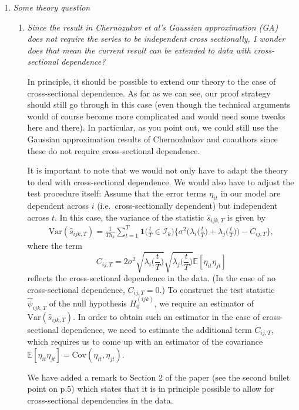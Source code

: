 \documentclass[a4paper,12pt]{article}
\begin{document}
\begin{enumerate}[label=(\arabic*),leftmargin=0.7cm]
\item \textit{Some theory question}

\begin{enumerate}[label=(\alph*),leftmargin=0.7cm]
\item \textit{Since the result in Chernozukov et al's Gaussian approximation (GA) does not require the series to be independent cross sectionally, I wonder does that mean the current result can be extended to data with cross-sectional dependence?}

In principle, it should be possible to extend our theory to the case of cross-sectional dependence. As far as we can see, our proof strategy should still go through in this case (even though the technical arguments would of course become more complicated and would need some tweaks here and there). In particular, as you point out, we could still use the Gaussian approximation results of Chernozhukov and coauthors since these do not require cross-sectional dependence. 

It is important to note that we would not only have to adapt the theory to deal with cross-sectional dependence. We would also have to adjust the test procedure itself: Assume that the error terms $\eta_{it}$ in our model are dependent across $i$ (i.e.\ cross-sectionally dependent) but independent across $t$. In this case, the variance of the statistic $\hat{s}_{ijk,T}$ is given by
\begin{align*}
\text{Var}(\hat{s}_{ijk,T}) = \frac{1}{Th_k} \sum_{t=1}^T \boldsymbol{1}\Big(\frac{t}{T} \in \mathcal{I}_k\Big) \bigg\{ \sigma^2 \Big( \lambda_i\Big(\frac{t}{T}\Big) + \lambda_j\Big(\frac{t}{T}\Big) \Big) - C_{ij,T} \bigg\},    
\end{align*}
where the term 
\[ C_{ij,T} = 2 \sigma^2 \sqrt{\lambda_i\Big(\frac{t}{T}\Big)} \sqrt{\lambda_j\Big(\frac{t}{T}\Big)} \mathbb{E}[\eta_{it} \eta_{jt}] \]
reflects the cross-sectional dependence in the data. (In the case of no cross-sectional dependence, $C_{ij,T} = 0$.) To construct the test statistic $\hat{\psi}_{ijk,T}$ of the null hypothesis $H_0^{(ijk)}$, we require an estimator of $\text{Var}(\hat{s}_{ijk,T})$. In order to obtain such an estimator in the case of cross-sectional dependence, we need to estimate the additional term $C_{ij,T}$, which requires us to come up with an estimator of the covariance $\mathbb{E}[\eta_{it} \eta_{jt}] = \text{Cov}(\eta_{it},\eta_{jt})$. 

We have added a remark to Section 2 of the paper (see the second bullet point on p.5) which states that it is in principle possible to allow for cross-sectional dependencies in the data.



\end{enumerate}
\end{enumerate}
\end{document}
